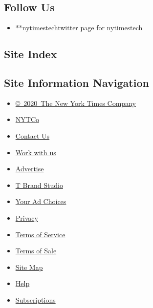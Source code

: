\hypertarget{follow-us}{%
\subsection{Follow Us}\label{follow-us}}

\begin{itemize}
\tightlist
\item
  \href{https://twitter.com/nytimestech}{**nytimestechtwitter page for
  nytimestech}
\end{itemize}

\hypertarget{site-index}{%
\subsection{Site Index}\label{site-index}}

\hypertarget{site-information-navigation}{%
\subsection{Site Information
Navigation}\label{site-information-navigation}}

\begin{itemize}
\tightlist
\item
  \href{https://help.nytimes.com/hc/en-us/articles/115014792127-Copyright-notice}{©~2020~The
  New York Times Company}
\end{itemize}

\begin{itemize}
\tightlist
\item
  \href{https://www.nytco.com/}{NYTCo}
\item
  \href{https://help.nytimes.com/hc/en-us/articles/115015385887-Contact-Us}{Contact
  Us}
\item
  \href{https://www.nytco.com/careers/}{Work with us}
\item
  \href{https://nytmediakit.com/}{Advertise}
\item
  \href{http://www.tbrandstudio.com/}{T Brand Studio}
\item
  \href{https://www.nytimes.com/privacy/cookie-policy\#how-do-i-manage-trackers}{Your
  Ad Choices}
\item
  \href{https://www.nytimes.com/privacy}{Privacy}
\item
  \href{https://help.nytimes.com/hc/en-us/articles/115014893428-Terms-of-service}{Terms
  of Service}
\item
  \href{https://help.nytimes.com/hc/en-us/articles/115014893968-Terms-of-sale}{Terms
  of Sale}
\item
  \href{https://spiderbites.nytimes.com}{Site Map}
\item
  \href{https://help.nytimes.com/hc/en-us}{Help}
\item
  \href{https://www.nytimes.com/subscription?campaignId=37WXW}{Subscriptions}
\end{itemize}
